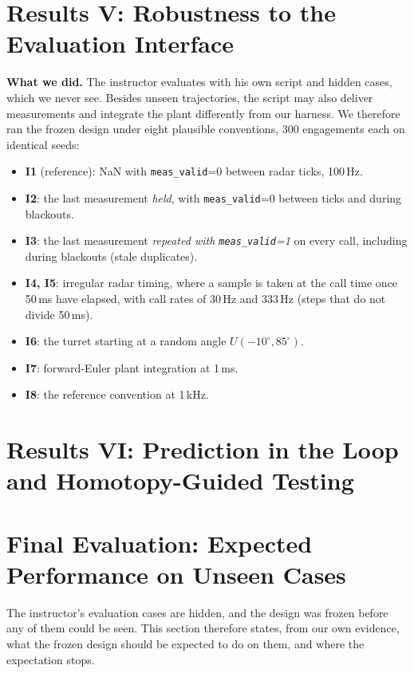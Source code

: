 \documentclass[11pt,a4paper]{article}
\begin{document}
\section{Results V: Robustness to the Evaluation Interface}
\label{sec:interface}
\textbf{What we did.} The instructor evaluates with his own script and hidden cases, which we never see. Besides unseen trajectories, the script may also deliver measurements and integrate the plant differently from our harness. We therefore ran the frozen design under eight plausible conventions, 300 engagements each on identical seeds:
\begin{itemize}
\item \textbf{I1} (reference): NaN with \texttt{meas\_valid}=0 between radar ticks, 100\,Hz.
\item \textbf{I2}: the last measurement \emph{held}, with \texttt{meas\_valid}=0 between ticks and during blackouts.
\item \textbf{I3}: the last measurement \emph{repeated with \texttt{meas\_valid}=1} on every call, including during blackouts (stale duplicates).
\item \textbf{I4, I5}: irregular radar timing, where a sample is taken at the call time once 50\,ms have elapsed, with call rates of 30\,Hz and 333\,Hz (steps that do not divide 50\,ms).
\item \textbf{I6}: the turret starting at a random angle $U(-10^\circ,85^\circ)$.
\item \textbf{I7}: forward-Euler plant integration at 1\,ms.
\item \textbf{I8}: the reference convention at 1\,kHz.
\end{itemize}



\section{Results VI: Prediction in the Loop and Homotopy-Guided Testing}
\label{sec:research}


\section{Final Evaluation: Expected Performance on Unseen Cases}
\label{sec:final}
The instructor's evaluation cases are hidden, and the design was frozen before any of them could be seen. This section therefore states, from our own evidence, what the frozen design should be expected to do on them, and where the expectation stops.
\end{document}
